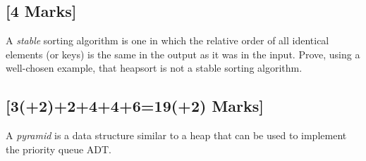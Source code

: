 \documentclass[12pt]{article}
\begin{document}
	\subsection{[4 Marks]}
	
	A \emph{stable} sorting algorithm is one in which the relative order
	of all identical elements (or keys) is the same in the output as it
	was in the input. Prove, using a well-chosen example, that heapsort is
	not a stable sorting algorithm.
	
	\subsection{[3(+2)+2+4+4+6=19(+2) Marks]}
	
	A \emph{pyramid} is a data structure similar to a heap that can be used
	to implement the priority queue ADT.
	
\end{document}
